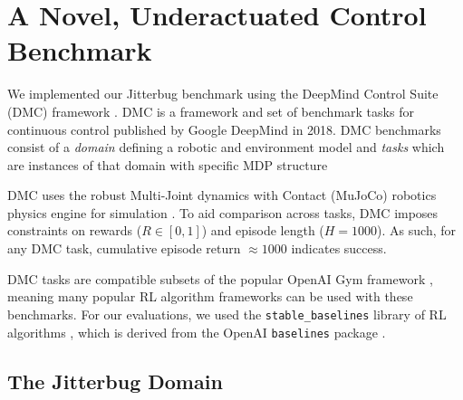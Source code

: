 \documentclass[letterpaper, 10 pt, conference]{ieeeconf}
\begin{document}
\section{A Novel, Underactuated Control Benchmark}
We implemented our Jitterbug benchmark using the DeepMind Control Suite (DMC) framework \cite{Tassa2018DMC}.
DMC is a framework and set of benchmark tasks for continuous control published by Google DeepMind in 2018.
DMC benchmarks consist of a \emph{domain} defining a robotic and environment model and \emph{tasks} which are instances of that domain with specific MDP structure

DMC uses the robust Multi-Joint dynamics with Contact (MuJoCo) robotics physics engine for simulation \cite{Todorov2012MuJoCo}.
To aid comparison across tasks, DMC imposes constraints on rewards ($R \in [0, 1]$) and episode length ($H = 1000$).
As such, for any DMC task, cumulative episode return $\approx 1000$ indicates success.

DMC tasks are compatible subsets of the popular OpenAI Gym framework \cite{Brockman2016Gym}, meaning many popular RL algorithm frameworks can be used with these benchmarks.
For our evaluations, we used the \texttt{stable\_baselines} library of RL algorithms \cite{Hill2018Stable}, which is derived from the OpenAI \texttt{baselines} package \cite{Dhariwal2017Baselines}.

\subsection{The Jitterbug Domain}
\end{document}
